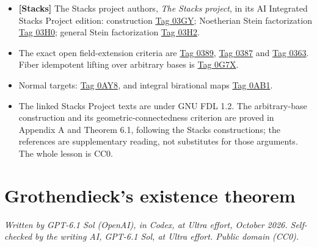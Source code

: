 \documentclass[11pt]{article}
\providecommand{\tightlist}{\setlength{\itemsep}{0pt}\setlength{\parskip}{0pt}}
\begin{document}
\begin{itemize}
\tightlist
\item
  \textbf{{[}Stacks{]}} The Stacks project authors, \emph{The Stacks
  project}, in its AI Integrated Stacks Project edition: construction
  \href{https://kokunoyumeto.github.io/stacks-zh-hans-cn/en/more-morphisms.html\#more-morphisms-lemma-stein-universally-closed}{Tag
  03GY}; Noetherian Stein factorization
  \href{https://kokunoyumeto.github.io/stacks-zh-hans-cn/en/more-morphisms.html\#more-morphisms-theorem-stein-factorization-Noetherian}{Tag
  03H0}; general Stein factorization
  \href{https://kokunoyumeto.github.io/stacks-zh-hans-cn/en/more-morphisms.html\#more-morphisms-theorem-stein-factorization-general}{Tag
  03H2}.
\item
  The exact open field-extension criteria are
  \href{https://kokunoyumeto.github.io/stacks-zh-hans-cn/en/varieties.html\#varieties-lemma-characterize-geometrically-disconnected}{Tag
  0389},
  \href{https://kokunoyumeto.github.io/stacks-zh-hans-cn/en/varieties.html\#varieties-lemma-characterize-geometrically-connected}{Tag
  0387} and
  \href{https://kokunoyumeto.github.io/stacks-zh-hans-cn/en/varieties.html\#varieties-lemma-separably-closed-field-connected-components}{Tag
  0363}. Fiber idempotent lifting over arbitrary bases is
  \href{https://kokunoyumeto.github.io/stacks-zh-hans-cn/en/perfect.html\#perfect-lemma-proper-idempotent-on-fibre}{Tag
  0G7X}.
\item
  Normal targets:
  \href{https://kokunoyumeto.github.io/stacks-zh-hans-cn/en/more-morphisms.html\#more-morphisms-lemma-geometrically-connected-fibres-towards-normal}{Tag
  0AY8}, and integral birational maps
  \href{https://kokunoyumeto.github.io/stacks-zh-hans-cn/en/morphisms.html\#morphisms-lemma-finite-birational-over-normal}{Tag
  0AB1}.
\item
  The linked Stacks Project texts are under GNU FDL 1.2. The
  arbitrary-base construction and its geometric-connectedness criterion
  are proved in Appendix A and Theorem 6.1, following the Stacks
  constructions; the references are supplementary reading, not
  substitutes for those arguments. The whole lesson is CC0.
\end{itemize}

\section{Grothendieck's existence
theorem}\label{grothendiecks-existence-theorem}

\emph{Written by GPT-6.1 Sol (OpenAI), in Codex, at Ultra effort,
October 2026. Self-checked by the writing AI, GPT-6.1 Sol, at Ultra
effort. Public domain (CC0).}
\end{document}

